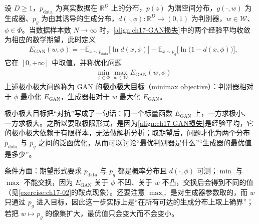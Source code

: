 \documentclass[../../main.tex]{subfiles}
\begin{document}
\begin{definition}\label{definition:ch17-极小极大目标}
设 $D\geqslant1$，$p_{\mathrm{data}}$ 为真实数据在 $\mathbb{R}^{D}$ 上的分布，$p(z)$ 为潜空间分布，$g(\cdot,w)$ 为生成器、$p_g$ 为由其诱导的生成分布，$d(\cdot,\phi):\mathbb{R}^{D}\to(0,1)$ 为判别器，$w\in\mathcal{W}$、$\phi\in\Phi$。当数据样本数 $N\to\infty$ 时，\eqref{align:ch17-GAN损失}中的两个经验平均收敛为相应的数学期望，此时定义
\begin{align*}
&E_{\mathrm{GAN}}(w,\phi)=-\mathbb{E}_{x\sim p_{\mathrm{data}}}\big[\ln d(x,\phi)\big]-\mathbb{E}_{x\sim p_g}\big[\ln\big(1-d(x,\phi)\big)\big],
\end{align*}
它在 $[0,+\infty]$ 中取值，并称优化问题
\begin{align*}
&\min_{\phi\in\Phi}\max_{w\in\mathcal{W}}E_{\mathrm{GAN}}(w,\phi)
\end{align*}
上述极小极大问题称为 GAN 的\textbf{极小极大目标}（minimax objective）：判别器相对于 $\phi$ 最小化 $E_{\mathrm{GAN}}$，生成器相对于 $w$ 最大化 $E_{\mathrm{GAN}}$。
\end{definition}

\begin{remark}
极小极大目标把“对抗”写成了一句话：同一个标量函数 $E_{\mathrm{GAN}}$ 上，一方求极小、一方求极大。之所以要取极限形式，是因为\eqref{align:ch17-GAN损失}是经验平均，它的极小极大依赖于有限样本，无法做解析分析；取期望后，问题才化为两个分布 $p_{\mathrm{data}}$ 与 $p_g$ 之间的泛函优化，从而可以讨论“最优判别器是什么”“生成器的最优值是多少”。

条件方面：期望形式要求 $p_{\mathrm{data}}$ 与 $p_g$ 都是概率分布且 $d(\cdot,\phi)$ 可测；$\min$ 与 $\max$ 不能交换，因为 $E_{\mathrm{GAN}}$ 关于 $\phi$ 不凹、关于 $w$ 不凸，交换后会得到不同的值（见\cref{exercise:ch17-02}的鞍点现象）。还要注意 $\max_w$ 是对生成器参数取的，而 $w$ 只通过 $p_g$ 进入目标，因此这一步实际上是“在所有可达的生成分布上取上确界”；若把 $w\mapsto p_g$ 的像集扩大，最优值只会变大而不会变小。
\end{remark}
\end{document}
